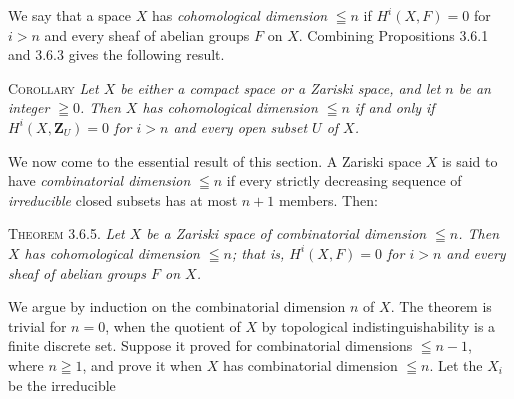 We say that a space $X$ has \textit{cohomological dimension} $\leqq n$ if
$H^i(X,F)=0$ for $i>n$ and every sheaf of abelian groups $F$ on $X$.
Combining Propositions 3.6.1 and 3.6.3 gives the following result.

\indent\textsc{Corollary} \textit{Let $X$ be either a compact space or
a Zariski space, and let $n$ be an integer $\geqq0$. Then $X$ has
cohomological dimension $\leqq n$ if and only if $H^i(X,\mathbf Z_U)=0$ for $i>n$ and
every open subset $U$ of $X$.}

We now come to the essential result of this section. A Zariski space $X$ is
said to have \textit{combinatorial dimension} $\leqq n$ if every strictly
decreasing sequence of \textit{irreducible} closed subsets has at most $n+1$ members.
Then:

\indent\textsc{Theorem 3.6.5.} \textit{Let $X$ be a Zariski space of
combinatorial dimension $\leqq n$. Then $X$ has cohomological dimension
$\leqq n$; that is, $H^i(X,F)=0$ for $i>n$ and every sheaf of abelian groups
$F$ on $X$.}

We argue by induction on the combinatorial dimension $n$ of $X$. The theorem
is trivial for $n=0$, when the quotient of $X$ by topological indistinguishability is a finite discrete set. Suppose it proved for
combinatorial dimensions $\leqq n-1$, where $n\geqq1$, and prove it when $X$ has
combinatorial dimension $\leqq n$. Let the $X_i$ be the irreducible

